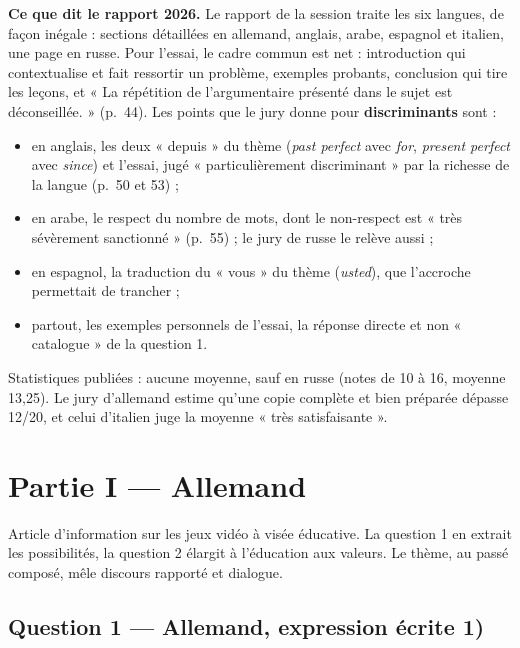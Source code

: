 \documentclass[11pt,a4paper]{article}
\providecommand{\tightlist}{\setlength{\itemsep}{0pt}\setlength{\parskip}{0pt}}
\begin{document}
\textbf{Ce que dit le rapport 2026.} Le rapport de la session traite les six langues, de façon inégale : sections détaillées en allemand, anglais, arabe, espagnol et italien, une page en russe. Pour l'essai, le cadre commun est net : introduction qui contextualise et fait ressortir un problème, exemples probants, conclusion qui tire les leçons, et « La répétition de l'argumentaire présenté dans le sujet est déconseillée. » (p.~44). Les points que le jury donne pour \textbf{discriminants} sont :

\begin{itemize}
\tightlist
\item
  en anglais, les deux « depuis » du thème (\emph{past perfect} avec \emph{for}, \emph{present perfect} avec \emph{since}) et l'essai, jugé « particulièrement discriminant » par la richesse de la langue (p.~50 et 53) ;
\item
  en arabe, le respect du nombre de mots, dont le non-respect est « très sévèrement sanctionné » (p.~55) ; le jury de russe le relève aussi ;
\item
  en espagnol, la traduction du « vous » du thème (\emph{usted}), que l'accroche permettait de trancher ;
\item
  partout, les exemples personnels de l'essai, la réponse directe et non « catalogue » de la question 1.
\end{itemize}

Statistiques publiées : aucune moyenne, sauf en russe (notes de 10 à 16, moyenne 13,25). Le jury d'allemand estime qu'une copie complète et bien préparée dépasse 12/20, et celui d'italien juge la moyenne « très satisfaisante ».

\hypertarget{partie-i-allemand}{%
\section{Partie I --- Allemand}\label{partie-i-allemand}}

Article d'information sur les jeux vidéo à visée éducative. La question 1 en extrait les possibilités, la question 2 élargit à l'éducation aux valeurs. Le thème, au passé composé, mêle discours rapporté et dialogue.

\hypertarget{question-1-allemand-expression-uxe9crite-1}{%
\subsection{Question 1 --- Allemand, expression écrite 1)}\label{question-1-allemand-expression-uxe9crite-1}}
\end{document}

